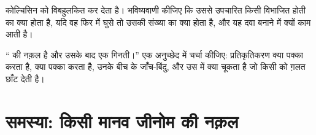\begin{exercise}[$\star\star\star$]\label{exo:b1:replication-mitosis:11}
कोल्चिसिन  को विबहुलकित कर देता है। भविष्यवाणी कीजिए कि
उससे उपचारित किसी विभाजित होती  का क्या होता है, यदि वह फिर
 में घुसे तो उसकी  संख्या का क्या होता है, और यह दवा
 बनाने में क्यों काम आती है।
\end{exercise}

\begin{exercise}[$\star\star\star$]\label{exo:b1:replication-mitosis:12}
``  की नक़ल है और उसके बाद एक गिनती।'' एक अनुच्छेद
में चर्चा कीजिए: प्रतिकृतिकरण क्या पक्का करता है,  क्या पक्का करता
है, उनके बीच के जाँच-बिंदु, और उस  में क्या चूकता है जो किसी
 को ग़लत छाँट देती है।
\end{exercise}

\section{समस्या: किसी मानव जीनोम की नक़ल}

